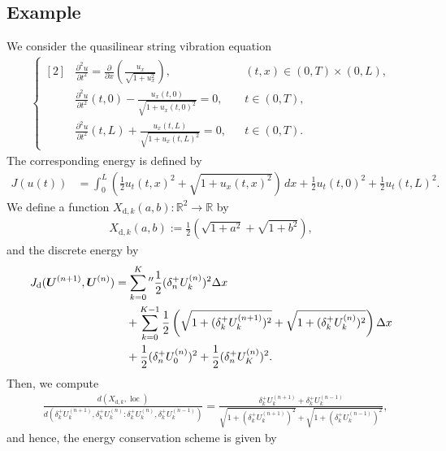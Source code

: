 \documentclass[dvipdfmx-if-dvi,autodetect-engine,ja=standard]{amsart}
\numberwithin{equation}{section} %
\def\vect#1{\mbox{\boldmath $#1$}} %
\DeclareMathOperator{\loc}{loc}
\begin{document}
\subsection{Example}
We consider the quasilinear string vibration equation
\begin{align}\label{eq:general:example:string}
    \left\{ \begin{aligned}[2]
    &\frac{\partial^2 u}{\partial t^2}
    = \frac{\partial}{\partial x}
    \left( \frac{u_x}{\sqrt{1+ u_x^2}} \right),
    &&(t,x) \in (0,T)\times (0,L),\\
    &\frac{\partial^2 u}{\partial t^2}(t,0)
    - \frac{u_x(t,0)}{\sqrt{1+ u_x(t,0)^2}} = 0,
    &&t\in (0,T),\\
    &\frac{\partial^2 u}{\partial t^2}(t,L)
    + \frac{u_x(t,L)}{\sqrt{1+ u_x(t,L)^2}} = 0,
    &&t\in (0,T).
    \end{aligned}\right.
\end{align}
The corresponding energy is defined by
\begin{align}
    J(u(t))
    &=
    \int_0^L \left(
    \frac{1}{2} u_t(t,x)^2
    + \sqrt{1+u_x(t,x)^2}
    \right)\,dx
    + \frac{1}{2}u_t(t,0)^2 + \frac{1}{2}u_t(t,L)^2.
\end{align}
We define a function
$X_{\mathrm{d},k}(a,b): \mathbb{R}^2 \to \mathbb{R}$
by
\begin{align}
    X_{\mathrm{d},k}(a,b)
    := \frac{1}{2} \left( \sqrt{1+a^2} + \sqrt{1+b^2} \right),
\end{align}
and the discrete energy by
\begin{align}
    J_{\mathrm{d}} (\vect{U}^{(n+1)}, \vect{U}^{(n)})
    &=
    \sum_{k=0}^K{}'' \frac{1}{2} (\delta_n^+ U_k^{(n)})^2 \Delta x \\
    &\quad +
    \sum_{k=0}^{K-1} 
    \frac{1}{2}
    \left(
        \sqrt{1 + (\delta_k^+ U_k^{(n+1)})^2}
        + \sqrt{1+ (\delta_k^+ U_k^{(n)})^2}
    \right)
    \Delta x \\
    &\quad
    + \frac{1}{2} (\delta_n^+ U_0^{(n)})^2
    + \frac{1}{2} (\delta_n^+ U_K^{(n)})^2.
\end{align}
Then, we compute
\begin{align}
    &\frac{d(X_{\mathrm{d},k}, \loc)}{d(\delta_k^+ U_k^{(n+1)}, \delta_k^+ U_k^{(n)} : \delta_k^+ U_k^{(n)}, \delta_k^+ U_k^{(n-1)})}
    =
    \frac{\delta_k^+ U_k^{(n+1)}+\delta_k^+ U_k^{(n-1)}}{
    \sqrt{1+(\delta_k^+ U_k^{(n+1)})^2}
    + \sqrt{1+(\delta_k^+ U_k^{(n-1)})^2}
    },
\end{align}
and hence, the energy conservation scheme is given by
\end{document}
